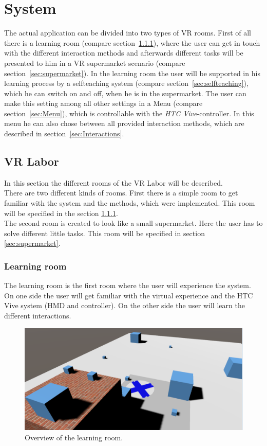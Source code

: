 
\section{System}\label{sec:System}
The actual application can be divided into two types of VR rooms. First of all there is a learning room (compare section~\ref{sec:Learningroom}), where the user can get in touch with the different interaction methods and afterwards different tasks will be presented to him in a VR supermarket scenario (compare section~\ref{sec:supermarket}). In the learning room the user will be supported in his learning process by a selfteaching system (compare section~\ref{sec:selfteaching}), which he can switch on and off, when he is in the supermarket. The user can make this setting among all other settings in a Menu  (compare section~\ref{sec:Menu}), which is controllable with the \textit{HTC Vive}-controller. In this menu he can also chose between all provided interaction methods, which are described in section~\ref{sec:Interactions}.

\subsection{VR Labor}\label{sec:VRLabor}
In this section the different rooms of the VR Labor will be described. \\
There are two different kinds of rooms. First there is a simple room to get familiar with the system and the methods, which were implemented. This room will be specified in the section \ref{sec:Learningroom}.\\
The second room is created to look like a small supermarket. Here the user has to solve different little tasks. This room will be specified in section \ref{sec:supermarket}.

\subsubsection{Learning room} \label{sec:Learningroom}
The learning room is the first room where the user will experience the system. On one side the user will get familiar with the virtual experience and the HTC Vive system (HMD and controller). On the other side the user will learn the different interactions. 

\begin{figure}[H] 
	\center 
	\includegraphics[width=12cm]{Images/learningRoom2.PNG}			
	\caption[Overview of the learning room.]{Overview of the learning room.}
	\label{fig:learning room}
\end{figure}

